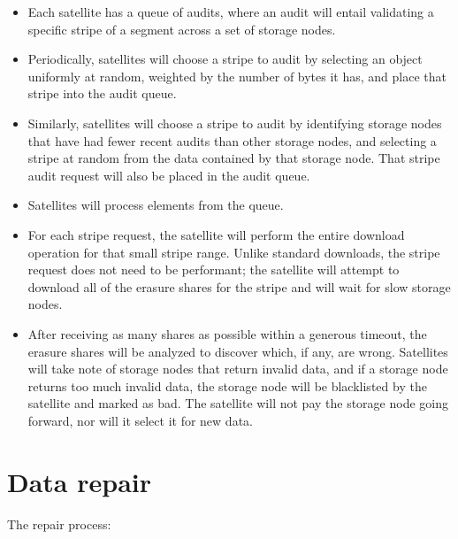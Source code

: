 \documentclass[11pt,fleqn,openany]{book}
\begin{document}
\begin{itemize}
\item Each satellite has a queue of audits, where an audit will entail
  validating a specific stripe of a segment across a set of storage nodes.
\item Periodically, satellites will choose a stripe to audit by selecting
  an object uniformly at random, weighted by the number of bytes it has,
and place that stripe into the audit queue.
\item Similarly, satellites will choose a stripe to audit by identifying
  storage nodes that have had fewer recent audits than other storage nodes, and
  selecting
  a stripe at random from the data contained by that storage node. That stripe
  audit
  request will also be placed in the audit queue.
\item Satellites will process elements from the queue.
\item For each stripe request, the satellite will perform the entire download
  operation for that small stripe range. Unlike standard downloads, the stripe
  request does not need to be performant; the satellite will attempt to
  download all of the erasure shares for the stripe and will wait for slow
  storage nodes.
\item After receiving as many shares as possible within a generous timeout,
  the erasure shares will be analyzed to discover which, if any, are wrong.
  Satellites will take note of storage nodes that return invalid data, and if
  a
  storage node returns too much invalid data, the storage node will be
  blacklisted by the
  satellite and marked as bad. The satellite will not pay the storage
  node going
  forward, nor will it select it for new data.
\end{itemize}

\section{Data repair}

The repair process:
\end{document}
